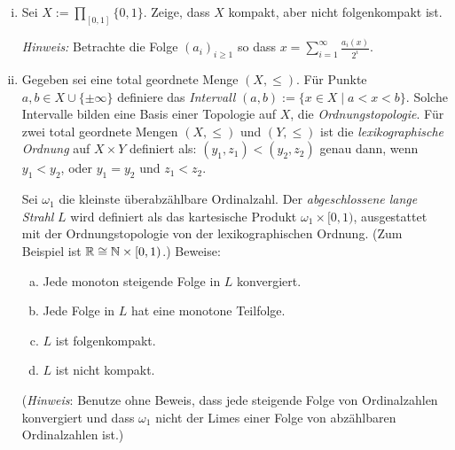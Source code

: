 \begin{aufgabe}
\begin{enumerate}[(i)]
\item Sei $X:=\prod_{[0,1]} \{0,1\}$. Zeige, dass $X$ kompakt, aber nicht folgenkompakt ist.
	
	\emph{Hinweis:} Betrachte die Folge $(a_i)_{i\geq 1}$ so dass $x=\sum_{i=1}^\infty \tfrac{a_i(x)}{2^i}$.

\item Gegeben sei eine total geordnete Menge $(X,\leq)$. F\"ur Punkte $a,b\in X\cup \{\pm \infty\}$ definiere das \emph{Intervall} $(a,b):=\{x\in X\mid a< x< b\}$. Solche Intervalle bilden eine Basis einer Topologie auf $X$, die \emph{Ordnungstopologie}. Für zwei total geordnete Mengen $(X,\leq)$ und $(Y,\leq)$ ist die \emph{lexikographische Ordnung} auf $X\times Y$ definiert als: $(y_1,z_1)< (y_2,z_2)$ genau dann, wenn $y_1< y_2$, oder $y_1=y_2$ und $z_1< z_2$. 

Sei $\omega_1$ die kleinste überabz\"ahlbare Ordinalzahl. Der \emph{abgeschlossene lange Strahl} $L$ wird definiert als das kartesische Produkt $\omega_1 \times [0,1)$, ausgestattet mit der Ordnungstopologie von der lexikographischen Ordnung. (Zum Beispiel ist $\mathbb{R}\cong \mathbb{N}\times [0,1)$.) Beweise:
\begin{enumerate}[(a)]
\item Jede monoton steigende Folge in $L$ konvergiert. 
\item Jede Folge in $L$ hat eine monotone Teilfolge. 
\item $L$ ist folgenkompakt.
\item $L$ ist nicht kompakt.
\end{enumerate}
(\emph{Hinweis}: Benutze ohne Beweis, dass jede steigende Folge von Ordinalzahlen konvergiert und dass $\omega_1$ nicht der Limes einer Folge von abz\"ahlbaren Ordinalzahlen ist.)
\end{enumerate}
\end{aufgabe}

